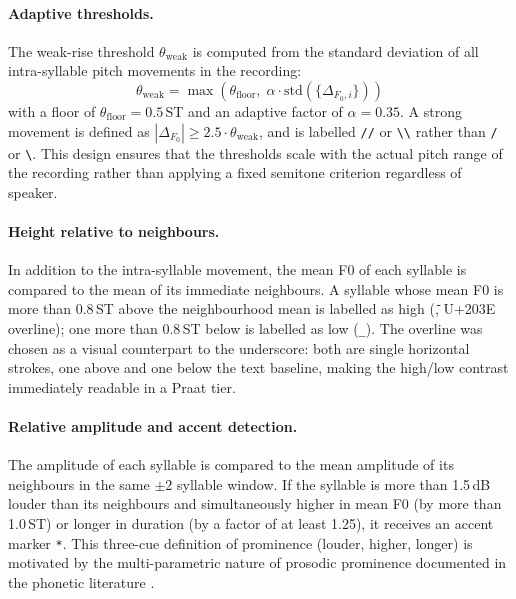 \paragraph{Adaptive thresholds.}
The weak-rise threshold $\theta_{\mathrm{weak}}$ is computed from the standard
deviation of all intra-syllable pitch movements in the recording:
\begin{equation}
  \theta_{\mathrm{weak}} = \max\!\left(\theta_{\mathrm{floor}},\;
    \alpha \cdot \mathrm{std}(\{\Delta_{F_0,i}\})\right)
\end{equation}
with a floor of $\theta_{\mathrm{floor}} = 0.5$\,ST and an adaptive factor of
$\alpha = 0.35$. A strong movement is defined as
$|\Delta_{F_0}| \geq 2.5 \cdot \theta_{\mathrm{weak}}$, and is labelled
\texttt{//} or \texttt{\textbackslash\textbackslash} rather than \texttt{/} or
\texttt{\textbackslash}. This design ensures that the thresholds scale with the
actual pitch range of the recording rather than applying a fixed semitone
criterion regardless of speaker.

\paragraph{Height relative to neighbours.}
In addition to the intra-syllable movement, the mean F0 of each syllable is
compared to the mean of its immediate neighbours. A syllable whose mean F0 is
more than 0.8\,ST above the neighbourhood mean is labelled as high
(\texttt{{\={}}}, U+203E overline); one more than 0.8\,ST below is labelled as
low (\texttt{\_}). The overline was chosen as a visual counterpart to the
underscore: both are single horizontal strokes, one above and one below the
text baseline, making the high/low contrast immediately readable in a Praat tier.

\paragraph{Relative amplitude and accent detection.}
The amplitude of each syllable is compared to the mean amplitude of its
neighbours in the same $\pm 2$ syllable window. If the syllable is more than
1.5\,dB louder than its neighbours and simultaneously higher in mean F0 (by more
than 1.0\,ST) or longer in duration (by a factor of at least 1.25), it receives
an accent marker \texttt{*}. This three-cue definition of prominence (louder,
higher, longer) is motivated by the multi-parametric nature of prosodic
prominence documented in the phonetic literature \cite{ladd2008intonational}.

